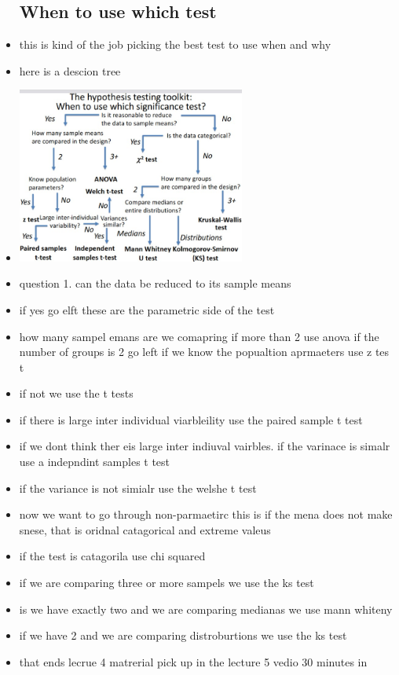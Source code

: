 \documentclass{article}
\begin{document}
\begin{itemize}
\subsection{When to use which test}
\item this is kind of the job picking the best test to use when and why 
\item here is a descion tree
\item \includegraphics[width=7.5cm]{Final_Review/lecture_4/hypothis tesitng tool kit.jpg}
\item question 1. can the data be reduced to its sample means 
\item if yes go elft these are the parametric side of the test
\item how many sampel emans are we comapring if more than 2 use anova
\itme if the number of groups is 2 go left 
\itme if we know the popualtion aprmaeters use z tes t
\item if not we use the t tests
\item if there is large inter individual viarbleility use the paired sample t test 
\item if we dont think ther eis large inter indiuval vairbles. if the varinace is simalr use a indepndint samples t test
\item if the variance is not simialr use the welshe t test
\item now we want to go through non-parmaetirc this is if the mena does not make snese, that is oridnal catagorical and extreme valeus 
\item if the test is catagorila use chi squared
\item if we are comparing three or more sampels we use the ks test 
\item is we have exactly two and we are comparing medianas we use mann whiteny
\item if we have 2 and we are comparing distroburtions we use the ks test
\item that ends lecrue 4 matrerial pick up in the lecture 5 vedio 30 minutes in 
\end{itemize}
\end{document}
